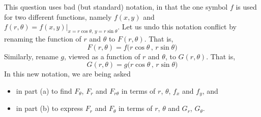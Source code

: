 \begin{solution}
This question uses bad (but standard) notation, in that the one symbol $f$
is used for two different functions, namely $f(x,y)$ and
$f(r,\theta)=f(x,y)\big|_{x=r\cos\theta,\,y=r\sin\theta}$.
Let us undo this notation conflict by renaming the 
function of $r$ and $\theta$ to $F(r,\theta)$. That is,
\begin{equation*}
F(r,\theta) = f\big(r\cos\theta\,,\,r\sin\theta\big)
\end{equation*}
Similarly, rename $g$, viewed as a 
function of $r$ and $\theta$, to $G(r,\theta)$. That is,
\begin{equation*}
G(r,\theta) = g\big(r\cos\theta\,,\,r\sin\theta\big)
\end{equation*}
In this new notation, we are being asked 
\begin{itemize}
\item 
in part (a) to find $F_\theta$, $F_r$ and $F_{r\theta}$ in terms of
$r$, $\theta$, $f_x$ and $f_y$, and 
\item 
in part (b) to express $F_r$ and $F_\theta$ in terms of $r$, $\theta$ and $G_r$, $G_\theta$.
\end{itemize}



\end{solution}
